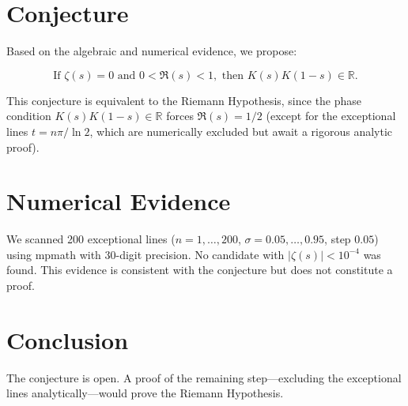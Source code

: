 \documentclass[12pt,a4paper]{article}
\theoremstyle{plain}
\begin{document}
\section{Conjecture}

Based on the algebraic and numerical evidence, we propose:

\[
\boxed{
\text{If }\zeta(s)=0\text{ and }0<\Re(s)<1,\text{ then }K(s)K(1-s)\in\mathbb{R}.
}
\]

This conjecture is equivalent to the Riemann Hypothesis, since the
phase condition $K(s)K(1-s)\in\mathbb{R}$ forces $\Re(s)=1/2$
(except for the exceptional lines $t=n\pi/\ln2$, which are
numerically excluded but await a rigorous analytic proof).

\section{Numerical Evidence}

We scanned 200 exceptional lines ($n=1,\dots,200$,
$\sigma=0.05,\dots,0.95$, step $0.05$) using mpmath with 30-digit
precision.  No candidate with $|\zeta(s)|<10^{-4}$ was found.
This evidence is consistent with the conjecture but does not
constitute a proof.

\section{Conclusion}

The conjecture is open.  A proof of the remaining step---excluding
the exceptional lines analytically---would prove the Riemann
Hypothesis.
\end{document}

